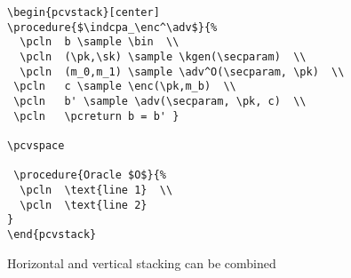 \documentclass[a4paper]{report}
\begin{document}
\begin{lstlisting}
\begin{pcvstack}[center]
\procedure{$\indcpa_\enc^\adv$}{%
  \pcln  b \sample \bin  \\
  \pcln  (\pk,\sk) \sample \kgen(\secparam)  \\
  \pcln  (m_0,m_1) \sample \adv^O(\secparam, \pk)  \\
 \pcln   c \sample \enc(\pk,m_b)  \\
 \pcln   b' \sample \adv(\secparam, \pk, c)  \\
 \pcln   \pcreturn b = b' }

\pcvspace

 \procedure{Oracle $O$}{%
  \pcln  \text{line 1}  \\
  \pcln  \text{line 2}  
}
\end{pcvstack}
\end{lstlisting}


Horizontal and vertical stacking can be combined
\begin{pchstack}[center]

\begin{pcvstack}%

\pcvspace

\begin{pchstack}


\end{pchstack}
\end{pcvstack}

\pchspace


\end{pchstack}
\end{document}
